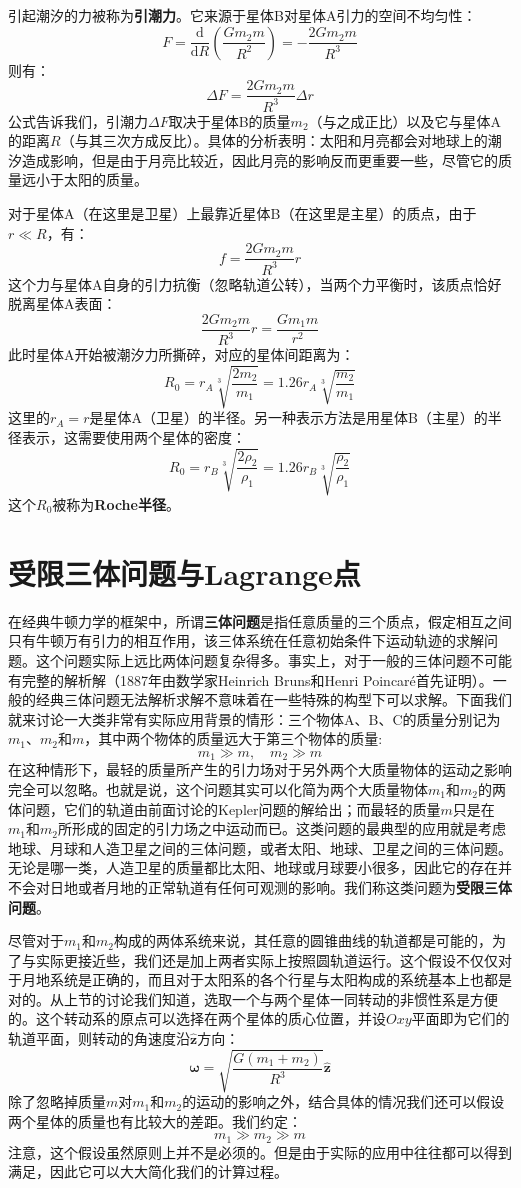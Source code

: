 \documentclass[a4paper,openany]{book}
\begin{document}
引起潮汐的力被称为\textbf{引潮力}。它来源于星体B对星体A引力的空间不均匀性：
\[
    F = \frac{\mathrm{d}}{\mathrm{d}R}\left(\frac{Gm_2 m}{R^2}\right) = -\frac{2Gm_2 m}{R^3}
\]
则有：
\[
    \boxed{\Delta F = \frac{2Gm_2 m}{R^3}\Delta r}
\]
公式告诉我们，引潮力$\Delta F$取决于星体B的质量$m_2$（与之成正比）以及它与星体A的距离$R$（与其三次方成反比）。具体的分析表明：太阳和月亮都会对地球上的潮汐造成影响，但是由于月亮比较近，因此月亮的影响反而更重要一些，尽管它的质量远小于太阳的质量。

对于星体A（在这里是卫星）上最靠近星体B（在这里是主星）的质点，由于$r \ll R$，有：
\[
    f = \frac{2Gm_2 m}{R^3}r
\]
这个力与星体A自身的引力抗衡（忽略轨道公转），当两个力平衡时，该质点恰好脱离星体A表面：
\[
    \frac{2Gm_2 m}{R^3}r = \frac{Gm_1 m}{r^2}
\]
此时星体A开始被潮汐力所撕碎，对应的星体间距离为：
\[
    \boxed{R_0 = r_A\sqrt[3]{\frac{2m_2}{m_1}} = 1.26r_A\sqrt[3]{\frac{m_2}{m_1}}}
\]
这里的$r_A = r$是星体A（卫星）的半径。另一种表示方法是用星体B（主星）的半径表示，这需要使用两个星体的密度：
\[
    \boxed{R_0 = r_B\sqrt[3]{\frac{2\rho_2}{\rho_1}} = 1.26r_B\sqrt[3]{\frac{\rho_2}{\rho_1}}}
\]
这个$R_0$被称为\textbf{Roche半径}。

\chapter*{受限三体问题与Lagrange点}

在经典牛顿力学的框架中，所谓\textbf{三体问题}是指任意质量的三个质点，假定相互之间只有牛顿万有引力的相互作用，该三体系统在任意初始条件下运动轨迹的求解问题。这个问题实际上远比两体问题复杂得多。事实上，对于一般的三体问题不可能有完整的解析解（1887年由数学家Heinrich Bruns和Henri Poincaré首先证明）。一般的经典三体问题无法解析求解不意味着在一些特殊的构型下可以求解。下面我们就来讨论一大类非常有实际应用背景的情形：三个物体A、B、C的质量分别记为$m_1$、$m_2$和$m$，其中两个物体的质量远大于第三个物体的质量:
\[
    m_1 \gg m,\quad m_2 \gg m
\]
在这种情形下，最轻的质量所产生的引力场对于另外两个大质量物体的运动之影响完全可以忽略。也就是说，这个问题其实可以化简为两个大质量物体$m_1$和$m_2$的两体问题，它们的轨道由前面讨论的Kepler问题的解给出；而最轻的质量$m$只是在$m_1$和$m_2$所形成的固定的引力场之中运动而已。这类问题的最典型的应用就是考虑地球、月球和人造卫星之间的三体问题，或者太阳、地球、卫星之间的三体问题。无论是哪一类，人造卫星的质量都比太阳、地球或月球要小很多，因此它的存在并不会对日地或者月地的正常轨道有任何可观测的影响。我们称这类问题为\textbf{受限三体问题}。

尽管对于$m_1$和$m_2$构成的两体系统来说，其任意的圆锥曲线的轨道都是可能的，为了与实际更接近些，我们还是加上两者实际上按照圆轨道运行。这个假设不仅仅对于月地系统是正确的，而且对于太阳系的各个行星与太阳构成的系统基本上也都是对的。从上节的讨论我们知道，选取一个与两个星体一同转动的非惯性系是方便的。这个转动系的原点可以选择在两个星体的质心位置，并设$Oxy$平面即为它们的轨道平面，则转动的角速度沿$\bm{\hat{z}}$方向：
\[
    \bm{\omega} = \sqrt{\frac{G(m_1 + m_2)}{R^3}}\bm{\hat{z}}
\]
除了忽略掉质量$m$对$m_1$和$m_2$的运动的影响之外，结合具体的情况我们还可以假设两个星体的质量也有比较大的差距。我们约定：
\[
    m_1 \gg m_2 \gg m
\]
注意，这个假设虽然原则上并不是必须的。但是由于实际的应用中往往都可以得到满足，因此它可以大大简化我们的计算过程。
\end{document}

